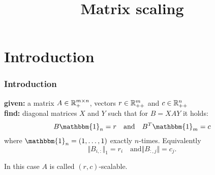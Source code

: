 \documentclass{beamer}
\title{Matrix scaling}
\begin{document}
\maketitle
\frame{\tableofcontents}

\section{Introduction}%

\begin{frame}
  \frametitle{Introduction}
  \textbf{given:} a matrix $A \in \mathbb{R}^{m\times n}_+$, vectors $r \in \mathbb{R}_{++}^m$ and $c \in \mathbb{R}^n_{++}$\\
  \textbf{find:} diagonal matrices $X$ and $Y$ such that for $B = XAY$ it holds:
  \begin{equation}
    B \mathbbm{1}_n = r \quad \text{and} \quad B^T \mathbbm{1}_m = c
  \end{equation}
  where $\mathbbm{1}_n = (1, \dots, 1)$ exactly $n$-times.
  Equivalently
  \begin{equation}
    \Vert B_{i,:} \Vert_1 = r_i \quad \text{and} \Vert B_{:, j} \Vert = c_j.
  \end{equation}

  \begin{block}{}
    In this case $A$ is called $(r,c)$-scalable.
  \end{block}
\end{frame}
\end{document}
